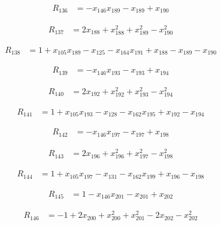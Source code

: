 \begin{align*}
R_{136} &= -x_{146} x_{189} -x_{189} +x_{190}
\end{align*}

\begin{align*}
R_{137} &= 2 x_{188} +x_{188}^{2} +x_{189}^{2} -x_{190}^{2}
\end{align*}

\begin{align*}
R_{138} &= 1 +x_{105} x_{189} -x_{125} -x_{164} x_{191} +x_{188} -x_{189} -x_{190}
\end{align*}

\begin{align*}
R_{139} &= -x_{146} x_{193} -x_{193} +x_{194}
\end{align*}

\begin{align*}
R_{140} &= 2 x_{192} +x_{192}^{2} +x_{193}^{2} -x_{194}^{2}
\end{align*}

\begin{align*}
R_{141} &= 1 +x_{105} x_{193} -x_{128} -x_{162} x_{195} +x_{192} -x_{194}
\end{align*}

\begin{align*}
R_{142} &= -x_{146} x_{197} -x_{197} +x_{198}
\end{align*}

\begin{align*}
R_{143} &= 2 x_{196} +x_{196}^{2} +x_{197}^{2} -x_{198}^{2}
\end{align*}

\begin{align*}
R_{144} &= 1 +x_{105} x_{197} -x_{131} -x_{162} x_{199} +x_{196} -x_{198}
\end{align*}

\begin{align*}
R_{145} &= 1 -x_{146} x_{201} -x_{201} +x_{202}
\end{align*}

\begin{align*}
R_{146} &= -1 +2 x_{200} +x_{200}^{2} +x_{201}^{2} -2 x_{202} -x_{202}^{2}
\end{align*}

